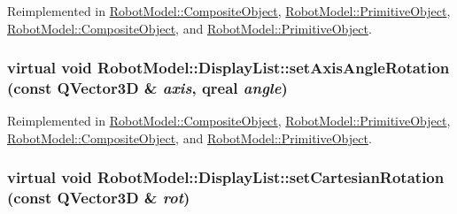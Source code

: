 Reimplemented in \hyperlink{class_robot_model_1_1_composite_object_a43f99ed52def7114d310e29fc6db83f3}{RobotModel::CompositeObject}, \hyperlink{class_robot_model_1_1_primitive_object_a3ae3782ae64f5fc07f4d18646e04ed21}{RobotModel::PrimitiveObject}, \hyperlink{class_robot_model_1_1_composite_object_a718690c002e0f74b430a75a9c4dfdf85}{RobotModel::CompositeObject}, and \hyperlink{class_robot_model_1_1_primitive_object_a4a91537e10478b31fb8a025c0faac770}{RobotModel::PrimitiveObject}.\hypertarget{class_robot_model_1_1_display_list_a56a652740c494995c0ff55d1a5fd896d}{
\subsubsection[{setAxisAngleRotation}]{\setlength{\rightskip}{0pt plus 5cm}virtual void RobotModel::DisplayList::setAxisAngleRotation (const QVector3D \& {\em axis}, \/  qreal {\em angle})}}
\label{class_robot_model_1_1_display_list_a56a652740c494995c0ff55d1a5fd896d}


Reimplemented in \hyperlink{class_robot_model_1_1_composite_object_a43f99ed52def7114d310e29fc6db83f3}{RobotModel::CompositeObject}, \hyperlink{class_robot_model_1_1_primitive_object_a3ae3782ae64f5fc07f4d18646e04ed21}{RobotModel::PrimitiveObject}, \hyperlink{class_robot_model_1_1_composite_object_a718690c002e0f74b430a75a9c4dfdf85}{RobotModel::CompositeObject}, and \hyperlink{class_robot_model_1_1_primitive_object_a4a91537e10478b31fb8a025c0faac770}{RobotModel::PrimitiveObject}.\hypertarget{class_robot_model_1_1_display_list_a7d52ea010f54755bcb3bfae9e26dd0c2}{
\subsubsection[{setCartesianRotation}]{\setlength{\rightskip}{0pt plus 5cm}virtual void RobotModel::DisplayList::setCartesianRotation (const QVector3D \& {\em rot})}}
\label{class_robot_model_1_1_display_list_a7d52ea010f54755bcb3bfae9e26dd0c2}


